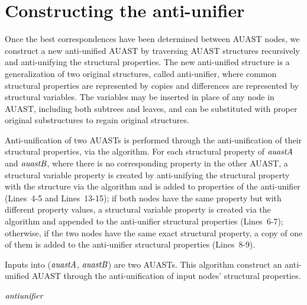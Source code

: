 \section{Constructing the anti-unifier} \label{meth-antiUnifier}
Once the best correspondences have been determined between AUAST nodes, we construct a new anti-unified AUAST by traversing AUAST structures recursively and anti-unifying the structural properties. The new anti-unified structure is a generalization of two original structures, called anti-unifier, where common structural properties are represented by copies and differences are represented by structural variables. The variables may be inserted in place of any node in AUAST, including both subtrees and leaves, and can be substituted with proper original substructures to regain original structures.

Anti-unification of two AUASTs is performed through the anti-unification of their structural properties, via the  algorithm. For each structural property of $\mathit{auastA}$ and $\mathit{auastB}$, where there is no corresponding property in the other AUAST, a structural variable property is created by anti-unifying the structural property with the \NIL{} structure via the  algorithm and is added to properties of the anti-unifier (Lines~4-5 and Lines~13-15); if both nodes have the same property but with different property values, a structural variable property is created via the  algorithm and appended to the anti-unifier structural properties (Lines~6-7); otherwise, if the two nodes have the same exact structural property, a copy of one of them is added to the anti-unifier structural properties (Lines~8-9).


\begin{algorithm}
 \caption{Inputs into ($\mathit{auastA}$, $\mathit{auastB}$) are two AUASTs. This algorithm construct an anti-unified AUAST through the anti-unification of input nodes' structural properties.}
  \label{AntiUnify}
  \begin{algorithmic}[1]
\AntiUnify
{}
	\Else
	\EndIf
\EndFor
{}
	
	\EndIf	
\EndFor
\Return $\mathit{antiunifier}$
\end{algorithmic}
\end{algorithm}

